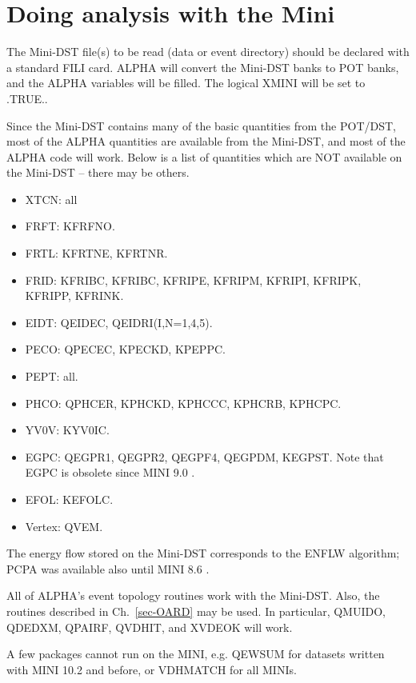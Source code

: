 \section{\label{sec-rtm}Doing analysis with the Mini}
\par
The Mini-DST file(s) to be read (data or event directory) should be
declared with a standard FILI card.
ALPHA will convert the Mini-DST banks to POT banks, and the ALPHA
variables will be filled.
The logical XMINI will be set to .TRUE..
\par
Since the Mini-DST contains many of the basic
quantities from the POT/DST, most of the ALPHA quantities are available
from the Mini-DST, and most of the ALPHA code will work.
Below is a list of quantities which are NOT available on the
Mini-DST -- there may be others.
\begin{itemize}
\item XTCN: all
\item FRFT: KFRFNO.
\item FRTL: KFRTNE, KFRTNR.
\item FRID: KFRIBC, KFRIBC, KFRIPE, KFRIPM, KFRIPI, KFRIPK, KFRIPP, KFRINK.
\item EIDT: QEIDEC, QEIDRI(I,N=1,4,5).
\item PECO: QPECEC, KPECKD, KPEPPC.
\item PEPT: all.
\item PHCO: QPHCER, KPHCKD, KPHCCC, KPHCRB, KPHCPC.
\item YV0V: KYV0IC.
\item EGPC: QEGPR1, QEGPR2, QEGPF4, QEGPDM, KEGPST.  Note that EGPC is obsolete since MINI 9.0 .
\item EFOL: KEFOLC.
\item Vertex: QVEM.
\end{itemize}
The energy flow stored on the Mini-DST corresponds to the ENFLW
algorithm;  PCPA was available also until MINI 8.6 .
\par
All of ALPHA's event topology routines work with the Mini-DST.  Also,
the routines
described in Ch.~\ref{sec-OARD} may be used.
In particular, QMUIDO, QDEDXM, QPAIRF, QVDHIT, and XVDEOK will work.
\par
A few packages cannot run on the MINI, e.g. QEWSUM for datasets written with MINI 10.2 and before, or VDHMATCH for all MINIs.


\par
